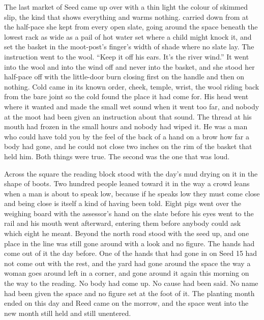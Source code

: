 
The last market of Seed came up over  with a thin light the colour of skimmed slip, the kind that shows everything and warms nothing.  carried  down from  at the half-pace she kept from every open slate, going around the space beneath the lowest rack as wide as a pail of hot water set where a child might knock it, and set the basket in the moot-post's finger's width of shade where no slate lay. The instruction went to the wool. “Keep it off his ears. It's the river wind.” It went into the wool and into the wind off  and never into the basket, and she stood her half-pace off with the little-door burn closing first on the handle and then on nothing. Cold came in its known order, cheek, temple, wrist, the wool riding back from the bare joint so the cold found the place it had come for. His head went where it wanted and made the small wet sound when it went too far, and nobody at the moot had been given an instruction about that sound. The thread at his mouth had frozen in the small hours and nobody had wiped it. He was a man who could have told you by the feel of the back of a hand on a brow how far a body had gone, and he could not close two inches on the rim of the basket that held him. Both things were true. The second was the one that was loud.

Across the square the reading block stood with the day's mud drying on it in the shape of boots. Two hundred people leaned toward it in the way a crowd leans when a man is about to speak low, because if he speaks low they must come close and being close is itself a kind of having been told. Eight pigs went over the weighing board with the assessor's hand on the slate before his eyes went to the rail and his mouth went afterward, entering them before anybody could ask which eight he meant. Beyond the north road  stood with the seed up, and one place in the line was still gone around with a look and no figure. The hands had come out of it the day before. One of the hands that had gone in on Seed 15 had not come out with the rest, and the yard had gone around the space the way a woman goes around  left in a corner, and gone around it again this morning on the way to the reading. No body had come up. No cause had been said. No name had been given the space and no figure set at the foot of it. The planting month ended on this day and Reed came on the morrow, and the space went into the new month still held and still unentered.


